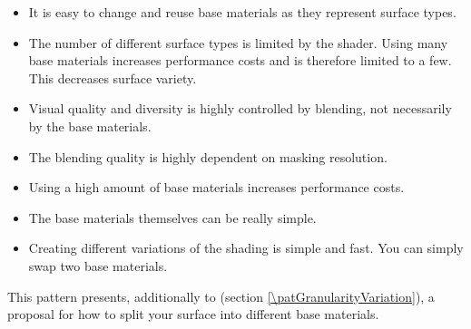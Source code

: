 \begin{description}
\begin{description}
\begin{itemize}
				\item It is easy to change and reuse base materials as they represent surface types.  
				\item The number of different surface types is limited by the shader. Using many base materials increases performance costs and is therefore limited to a few. This decreases surface variety. 
				\item Visual quality and diversity is highly controlled by blending, not necessarily by the base materials.
				\item The blending quality is highly dependent on masking resolution. 
			\end{itemize}
		\item[\performance:]\hfill
			\begin{itemize}
				\item Using a high amount of base materials increases performance costs. 
			\end{itemize}
		\item[\pipeline:]\hfill
			\begin{itemize}
				\item The base materials themselves can be really simple.  
				\item Creating different variations of the shading is simple and fast. You can simply swap two base materials.
			\end{itemize} 
	\end{description}
	\item[\patRelations:]%
	This pattern presents, additionally to \emph{\patGranularityVariation} (section \ref{\patGranularityVariation}), a proposal for how to split your surface into different base materials. 
\end{description}



